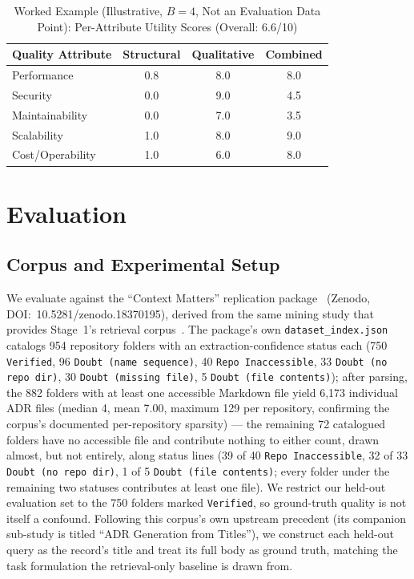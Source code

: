 \documentclass[lettersize,journal]{IEEEtran}
\begin{document}
\begin{table}[t]
\caption{Worked Example (Illustrative, $B=4$, Not an Evaluation Data Point): Per-Attribute Utility Scores (Overall: 6.6/10)\label{tab:worked-example}}
\centering
\footnotesize
\begin{tabular}{@{}lccc@{}}
\toprule
Quality Attribute & Structural & Qualitative & Combined \\
\midrule
Performance       & 0.8 & 8.0 & 8.0 \\
Security          & 0.0 & 9.0 & 4.5 \\
Maintainability   & 0.0 & 7.0 & 3.5 \\
Scalability       & 1.0 & 8.0 & 9.0 \\
Cost/Operability  & 1.0 & 6.0 & 8.0 \\
\bottomrule
\end{tabular}
\end{table}

\section{Evaluation}
\label{sec:evaluation}

\subsection{Corpus and Experimental Setup}

We evaluate against the ``Context Matters'' replication package~\cite{contextmatters-zenodo} (Zenodo, DOI:~10.5281/zenodo.18370195), derived from the same mining study that provides Stage~1's retrieval corpus~\cite{buchgeher2023adr}. The package's own \texttt{dataset\_index.json} catalogs 954 repository folders with an extraction-confidence status each (750 \texttt{Verified}, 96 \texttt{Doubt (name sequence)}, 40 \texttt{Repo Inaccessible}, 33 \texttt{Doubt (no repo dir)}, 30 \texttt{Doubt (missing file)}, 5 \texttt{Doubt (file contents)}); after parsing, the 882 folders with at least one accessible Markdown file yield 6{,}173 individual ADR files (median 4, mean 7.00, maximum 129 per repository, confirming the corpus's documented per-repository sparsity) --- the remaining 72 catalogued folders have no accessible file and contribute nothing to either count, drawn almost, but not entirely, along status lines (39 of 40 \texttt{Repo Inaccessible}, 32 of 33 \texttt{Doubt (no repo dir)}, 1 of 5 \texttt{Doubt (file contents)}; every folder under the remaining two statuses contributes at least one file). We restrict our held-out evaluation set to the 750 folders marked \texttt{Verified}, so ground-truth quality is not itself a confound. Following this corpus's own upstream precedent (its companion sub-study is titled ``ADR Generation from Titles''), we construct each held-out query as the record's title and treat its full body as ground truth, matching the task formulation the retrieval-only baseline is drawn from.
\end{document}
